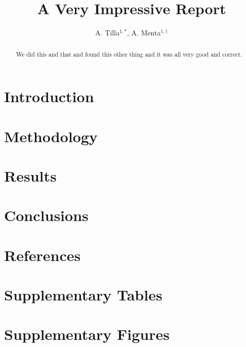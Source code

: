 \documentclass{anotherarticlestyle}
\title{A Very Impressive Report}
\author{A. Tilla$^{1,*}$, A. Menta$^{1, \dagger}$}
\begin{document}
\maketitle

\begin{strip}
    \begin{abstract}
        {\small We did this and that and found this other thing and it was all very good and correct.}
    \end{abstract}
\end{strip}

\section{Introduction}


\section{Methodology}


\section{Results}


\section{Conclusions}


\newpage
\pagebreak

\section*{References}






\onecolumn
\newpage
\pagebreak
\section*{Supplementary Tables}


\twocolumn
\onecolumn
\newpage
\pagebreak
\section*{Supplementary Figures}

\end{document}
